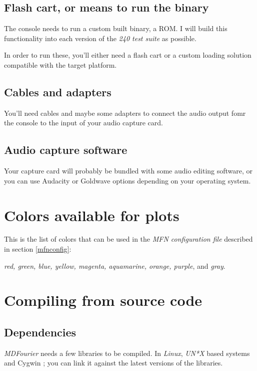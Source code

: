 \documentclass[10pt,a4paper]{report}
\begin{document}
\begin{appendices}
\section{Flash cart, or means to run the binary}

The console needs to run a custom built binary, a ROM. I will build this functionality into each version of the \textit{240 test suite} \cite{240pSuite} as possible.

In order to run these, you'll either need a flash cart or a custom loading solution compatible with the target platform.

\section{Cables and adapters}

You'll need cables and maybe some adapters to connect the audio output fomr the console to the input of your audio capture card.

\section{Audio capture software}

Your capture card will probably be bundled with some audio editing software, or you can use  Audacity \cite{audacity} or Goldwave \cite{goldwave} options depending on your operating system.

\chapter{Colors available for plots}
\label{availablecolors}

This is the list of colors that can be used in the \textit{MFN configuration file} described in section \ref{mfnconfig}: 

\textit{red, green, blue, yellow, magenta, aquamarine, orange, purple}, and \textit{gray}.

\chapter{Compiling from source code}

\section{Dependencies}

\textit{MDFourier} needs a few libraries to be compiled. In \textit{Linux}, \textit{UN*X} based systems and Cygwin \cite{cygwin}; you can link it against the latest versions of the libraries. 


\end{appendices}
\end{document}
